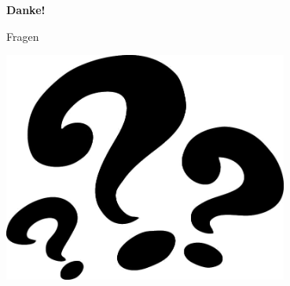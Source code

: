 \documentclass{beamer}
\begin{document}
\begin{frame}
\begin{center}
\begin{Huge}\textbf{Danke!}\end{Huge}
\end{center}
\end{frame}


\begin{frame}{Fragen}
\begin{center}
\includegraphics[width=0.7\textwidth]{./images/question-marks.png}
\end{center}
\end{frame}
\end{document}
